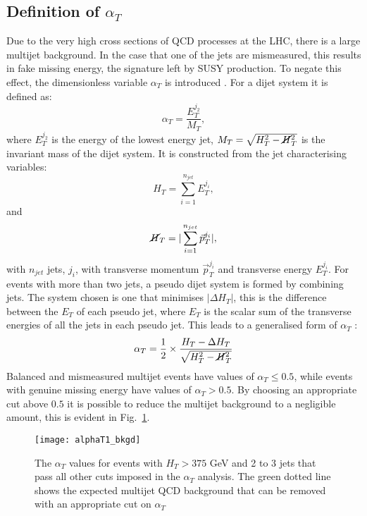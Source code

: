 \subsection{Definition of \boldmath $\alpha_T$}

Due to the very high cross sections of QCD processes at the LHC, there is a large multijet background. In the case that one of the jets are mismeasured, this results in fake missing energy, the signature left by SUSY production. To negate this effect, the dimensionless variable $\alpha_T$ is introduced \cite{AlphaTproposalCMS:2008vya} \cite{AlphaTproposalPhysRevLett.101.221803}. For a dijet system it is defined as:
\begin{equation}
\alpha_T=\frac{E_T^{j_2}}{M_T},
\end{equation}
where $E_T^{j_2}$ is the energy of the lowest energy jet, $M_T=\sqrt{H_T^2-\cancel{H}_T^2}$ is the invariant mass of the dijet system. It is constructed from the jet characterising variables:
\begin{equation}
H_T=\sum_{i=1}^{n_{jet}}E_T^{j_i}, 
\end{equation}
and
\begin{equation}
\cancel{H}_T=|\sum_{i=1}^{n_{jet}}\vec{p}_T^{j_i}|,
\end{equation}
with $n_{jet}$ jets, $j_i$, with transverse momentum $\vec{p}_T^{j_i}$ and transverse energy $E_T^{j_i}$. For events with more than two jets, a pseudo dijet system is formed by combining jets. The system chosen is one that minimises $|\Delta H_T|$, this is the difference between the $E_T$ of each pseudo jet, where $E_T$ is the scalar sum of the transverse energies of all the jets in each pseudo jet. This leads to a generalised form of $\alpha_T$ \cite{AlphaT8TeVChatrchyan:2013lya}:
\begin{equation}
\alpha_T=\frac{1}{2}\times\frac{H_T-\Delta H_T}{\sqrt{H_T^2-\cancel{H}_T^2}}
\end{equation}
Balanced and mismeasured multijet events have values of $\alpha_T\leq0.5$, while events with genuine missing energy have values of $\alpha_T>0.5$. By choosing an appropriate cut above $0.5$ it is possible to reduce the multijet background to a negligible amount, this is evident in Fig.~\ref{fig:alphaT}. 

\begin{figure}
	\begin{center}
		\texttt{[image: alphaT1\_bkgd]}
	\end{center}
	\caption{The $\alpha_T$ values for events with $H_T>375$ GeV and 2 to 3 jets that pass all other cuts imposed in the $\alpha_T$ analysis. The green dotted line shows the expected multijet QCD background that can be removed with an appropriate cut on $\alpha_T$ \cite{AlphaT8TeVChatrchyan:2013lya}}
	\label{fig:alphaT}
\end{figure}

